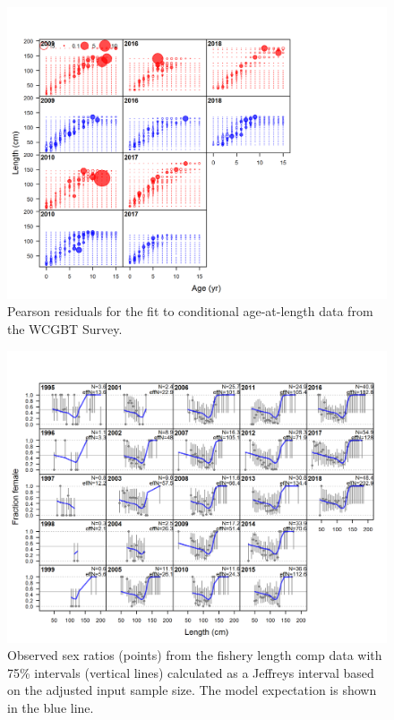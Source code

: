 \documentclass[12pt,]{article}
\begin{document}
\begin{figure}
\centering
\includegraphics{r4ss/plots_mod1/comp_condAALfit_residsflt5mkt0.png}
\caption{Pearson residuals for the fit to conditional age-at-length data
from the WCGBT Survey. \label{fig:age_fit_WCGBTS}}
\end{figure}

\begin{figure}
\centering
\includegraphics{r4ss/plots_mod1/sexratio_len_flt1mkt2.png}
\caption{Observed sex ratios (points) from the fishery length comp data
with 75\% intervals (vertical lines) calculated as a Jeffreys interval
based on the adjusted input sample size. The model expectation is shown
in the blue line.\label{fig:sexratio_len_flt1mkt2}}
\end{figure}
\end{document}
